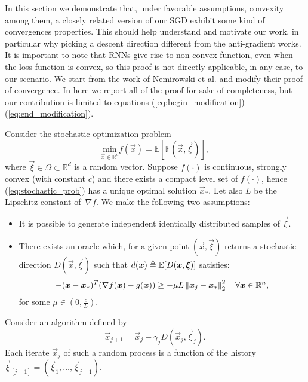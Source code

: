 In this section we demonstrate that, under favorable assumptions, convexity among them, a closely related version of our SGD exhibit some kind of convergences properties. This should help understand and motivate our work, in particular why picking a descent direction different from the anti-gradient works. It is important to note that RNNs give rise to non-convex function, even when the loss function is convex, so this proof is not directly applicable, in any case, to our scenario.  We start from the work of Nemirowski et al.\cite{Nemirovski} and modify their proof of convergence. In here we report all of the proof for sake of completeness, but our contribution is limited to equations (\ref{eq:begin_modification}) - (\ref{eq:end_modification}).


Consider the stochastic optimization problem 
\begin{equation}
\underset{\vec{x} \in \mathbb{R}^n}{\text{min}} f(\vec{x}) = \mathbb{E[F(\vec{x}, \vec{\xi})]},
\label{eq:stochastic_prob}
\end{equation}
where $\vec{\xi} \in \Omega \subset \mathbb{R}^d$ is a random vector.
Suppose $f(\cdot)$ is continuous, strongly convex (with constant $c$) and there exists a compact level set of $f(\cdot)$, hence (\ref{eq:stochastic_prob}) has a unique optimal solution $\vec{x}_*$. Let also $L$ be the Lipschitz constant of~$\nabla f$.
We make the following two assumptions:
\begin{itemize}
	\item	It is possible to generate independent identically distributed samples of $\vec{\xi}$.
	\item There exists an oracle which, for a given point $(\vec{x}, \vec{\xi})$ returns a stochastic direction $D(\vec{x}, \vec{\xi})$ such that $d(\boldsymbol{x})\triangleq\mathbb{E}[D(\boldsymbol{x}, \boldsymbol{\xi})]$ satisfies:
	\begin{equation}
	-(\boldsymbol{x}-\boldsymbol{x}_*)^T (\nabla f(\boldsymbol{x}) -g(\boldsymbol{x})) \geq -\mu L \left\Vert \boldsymbol{x}_j-\boldsymbol{x}_* \right\Vert^2_2\quad \forall \boldsymbol{x} \in \mathbb{R}^n,
	\label{eq:angular_condition}
	\end{equation}
	for some $\mu \in (0,\frac{c}{L}) $.
\end{itemize}
Consider an algorithm defined by
\begin{equation}
\vec{x}_{j+1} = \vec{x}_j -\gamma_j D(\vec{x}_j,\vec{\xi}_j).
\label{eq:stochastic_algo}
\end{equation}
Each iterate $\vec{x}_j$ of such a random process is a function of the history $\vec{\xi}_{[j-1]}=(\vec{\xi}_1,\dots, \vec{\xi}_{j-1}).$

